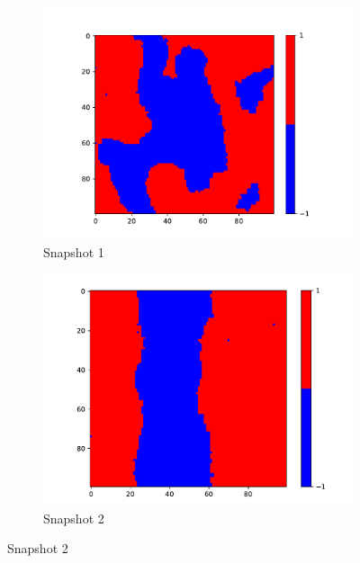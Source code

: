   \begin{figure}
    \centering
    \begin{subfigure}{0.45\textwidth}
      \centering
      \includegraphics[width=\linewidth]{images/Ising1_0_copy.pdf}
      \caption{Snapshot 1}
      \label{fig:image1}
    \end{subfigure}
    \hfill
    \begin{subfigure}{0.45\textwidth}
      \centering
      \includegraphics[width=\linewidth]{images/Ising1_2_copy.pdf}
      \caption{Snapshot 2}
      \label{fig:image2}
    \end{subfigure}
    
    \vspace{0.5cm}
    

\end{figure}
